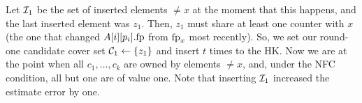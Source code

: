 Let $\mathcal{I}_1$ be the set of inserted elements $\not= x$ at the moment that this happens, and the last inserted element was $z_1$. Then, $z_1$ must share at least one counter with $x$ (the one that changed $A[i][p_i].\textup{fp}$ from $\textup{fp}_x$ most recently). So, we set our round-one candidate cover set $\mathcal{C}_1\gets \{z_1\}$ and insert $t$ times to the HK. Now we are at the point when all $c_1, \dots, c_k$ are owned by elements $\neq x$, and, under the NFC condition, all but one are of value one. Note that inserting $\mathcal{I}_1$ increased the estimate error by one.
\begin{figure*}[h]
	\centering
	\begin{pchstack}[boxed,center,space=0.5em]
		\begin{pcvstack}
		\end{pcvstack}
		\begin{pcvstack}[space=0.45em]
\end{pcvstack}
\end{pchstack}
\end{figure*}
